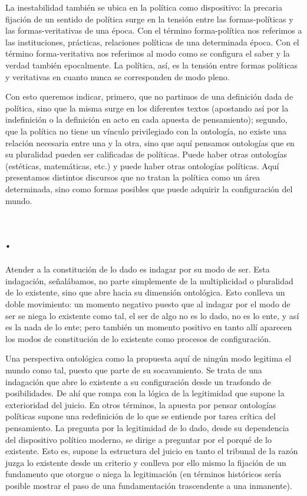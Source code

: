 La inestabilidad también se ubica en la política como dispositivo: la precaria fijación de un sentido de política surge en la tensión entre las formas-políticas y las formas-veritativas de una época. Con el término forma-política nos referimos a las instituciones, prácticas, relaciones políticas de una determinada época. Con el término forma-veritativa nos referimos al modo como se configura el saber y la verdad también epocalmente. La política, así, es la tensión entre formas políticas y veritativas en cuanto nunca se corresponden de modo pleno.

Con esto queremos indicar, primero, que no partimos de una definición dada de política, sino que la misma surge en los diferentes textos (apostando así por la indefinición o la definición en acto en cada apuesta de pensamiento); segundo, que la política no tiene un vínculo privilegiado con la ontología, no existe una relación necesaria entre una y la otra, sino que aquí pensamos ontologías que en su pluralidad pueden ser calificadas de políticas. Puede haber otras ontologías (estéticas, matemáticas, etc.) y puede haber otras ontologías políticas. Aquí presentamos distintos discursos que no tratan la política como un área determinada, sino como formas posibles que puede adquirir la configuración del mundo.

\section*{.}

Atender a la constitución de lo dado es indagar por su modo de ser. Esta indagación, señalábamos, no parte simplemente de la multiplicidad o pluralidad de lo existente, sino que abre hacia su dimensión ontológica. Esto conlleva un doble movimiento: un momento negativo puesto que al indagar por el modo de ser se niega lo existente como tal, el ser de algo no es lo dado, no es lo ente, y así es la nada de lo ente; pero también un momento positivo en tanto allí aparecen los modos de constitución de lo existente como procesos de configuración.

Una perspectiva ontológica como la propuesta aquí de ningún modo legitima el mundo como tal, puesto que parte de su socavamiento. Se trata de una indagación que abre lo existente a su configuración desde un trasfondo de posibilidades. De ahí que rompa con la lógica de la legitimidad que supone la exterioridad del juicio. En otros términos, la apuesta por pensar ontologías políticas supone una redefinición de lo que se entiende por tarea crítica del pensamiento. La pregunta por la legitimidad de lo dado, desde su dependencia del dispositivo político moderno, se dirige a preguntar por el porqué de lo existente. Esto es, supone la estructura del juicio en tanto el tribunal de la razón juzga lo existente desde un criterio y conlleva por ello mismo la fijación de un fundamento que otorgue o niega la legitimación (en términos históricos sería posible mostrar el paso de una fundamentación trascendente a una inmanente).


